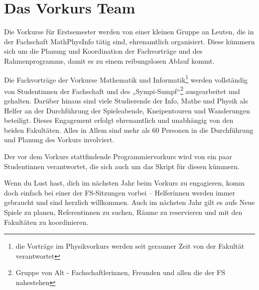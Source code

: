 \section{Das Vorkurs Team}
Die Vorkurse für Erstsemester werden von einer kleinen Gruppe an Leuten, die in der Fachschaft MathPhysInfo tätig sind, ehrenamtlich organisiert. Diese kümmern sich um die Planung und Koordination der Fachvorträge und des Rahmenprogramms, damit es zu einem reibungslosen Ablauf kommt.

Die Fachvorträge der Vorkurse Mathematik und Informatik\footnote{die Vorträge im Physikvorkurs werden seit geraumer Zeit von der Fakultät verantwortet} werden vollständig von Studentinnen der Fachschaft und des „Sympi-Sumpf“\footnote{Gruppe von Alt - Fachschaftlerinnen, Freunden und allen die der FS nahestehen} ausgearbeitet und gehalten. Darüber hinaus sind viele Studierende der Info, Mathe und Physik als Helfer an der Durchführung der Spieleabende, Kneipentouren und Wanderungen beteiligt. Dieses Engagement erfolgt ehrenamtlich und unabhängig von den beiden Fakultäten. Alles in Allem sind mehr als 60 Personen in die Durchführung und Planung des Vorkurs involviert.

Der vor dem Vorkurs stattfindende Programmiervorkurs wird von ein paar Studentinnen verantwortet, die sich auch um das Skript für diesen kümmern.

Wenn du Lust hast, dich im nächsten Jahr beim Vorkurs zu engagieren, komm doch einfach bei einer der FS-Sitzungen vorbei -- Helferinnen werden immer gebraucht und sind herzlich willkommen. Auch im nächsten Jahr gilt es aufs Neue Spiele zu planen, Referentinnen zu suchen, Räume zu reservieren und mit den Fakultäten zu koordinieren.
